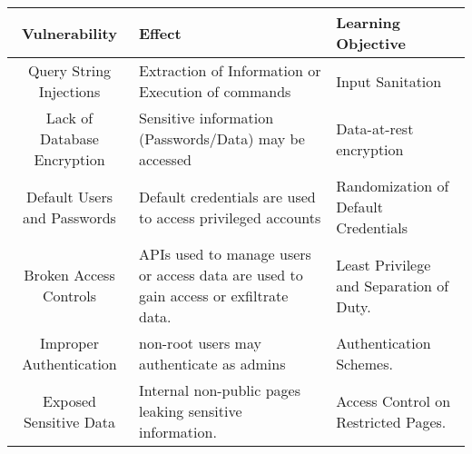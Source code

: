 \begin{tabular}{|c|p{4cm}|p{4cm}|}
     \hline
     \textbf{Vulnerability}& \textbf{Effect}&\textbf{Learning Objective} \\
     \hline
     Query String Injections & Extraction of Information or Execution of commands & Input Sanitation\\
     \hline
     Lack of Database Encryption & Sensitive information (Passwords/Data) may be accessed & Data-at-rest encryption\\
     \hline
     Default Users and Passwords & Default credentials are used to access privileged accounts& Randomization of Default Credentials\\
     \hline
     Broken Access Controls & APIs used to manage users or access data are used to gain access or exfiltrate data. & Least Privilege and Separation of Duty.\\
     \hline
     Improper Authentication & non-root users may authenticate as admins & Authentication Schemes.\\
     \hline
     Exposed Sensitive Data & Internal non-public pages leaking sensitive information. & Access Control on Restricted Pages.\\
     \hline
\end{tabular}




